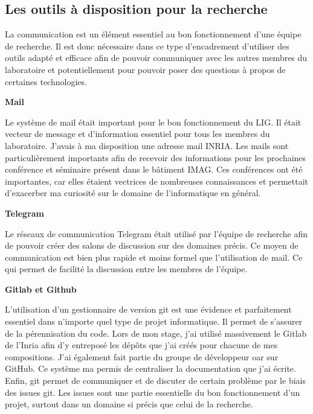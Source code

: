 \documentclass[a4paper,french,12pt, titlepage]{article}
\begin{document}
\newpage

\hypertarget{les-outils-uxe0-disposition-pour-la-recherche}{%
\subsection{Les outils à disposition pour la
recherche}\label{les-outils-uxe0-disposition-pour-la-recherche}}

La communication est un élément essentiel au bon fonctionnement d'une
équipe de recherche. Il est donc nécessaire dans ce type d'encadrement
d'utiliser des outils adapté et efficace afin de pouvoir communiquer
avec les autres membres du laboratoire et potentiellement pour pouvoir
poser des questions à propos de certaines technologies.\newline

\textbf{Mail}\newline

Le système de mail était important pour le bon fonctionnement du LIG. Il
était vecteur de message et d'information essentiel pour tous les
membres du laboratoire. J'avais à ma disposition une adresse mail INRIA.
Les mails sont particulièrement importants afin de recevoir des
informations pour les prochaines conférence et séminaire présent dans le
bâtiment IMAG. Ces conférences ont été importantes, car elles étaient
vectrices de nombreuses connaissances et permettait d'exacerber ma
curiosité sur le domaine de l'informatique en général.\newline

\textbf{Telegram}\newline

Le réseaux de communication Telegram était utilisé par l'équipe de
recherche afin de pouvoir créer des salons de discussion sur des
domaines précis. Ce moyen de communication est bien plus rapide et moins
formel que l'utilisation de mail. Ce qui permet de facilité la
discussion entre les membres de l'équipe.\newline

\textbf{Gitlab et Github}\newline

L'utilisation d'un gestionnaire de version git est une évidence et
parfaitement essentiel dans n'importe quel type de projet informatique.
Il permet de s'assurer de la pérennisation du code. Lors de mon stage,
j'ai utilisé massivement le Gitlab de l'Inria afin d'y entreposé les
dépôts que j'ai créés pour chacune de mes compositions. J'ai également
fait partie du groupe de développeur oar sur GitHub. Ce système ma
permis de centraliser la documentation que j'ai écrite. Enfin, git
permet de communiquer et de discuter de certain problème par le biais
des issues git. Les issues sont une partie essentielle du bon
fonctionnement d'un projet, surtout dans un domaine si précis que celui
de la recherche.
\end{document}
